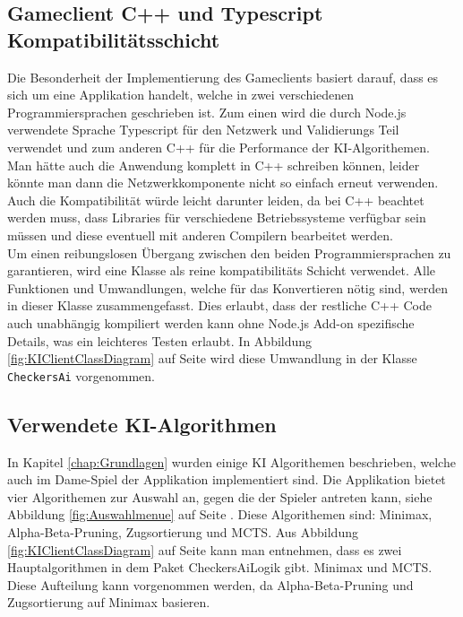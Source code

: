 \documentclass[12pt,a4paper,bibliography=totocnumbered,listof=totocnumbered]{article}
\begin{document}
\subsection{Gameclient C++ und Typescript Kompatibilitätsschicht}
Die Besonderheit der Implementierung des Gameclients basiert darauf, dass es sich um eine Applikation handelt, welche in zwei verschiedenen 
Programmiersprachen geschrieben ist. Zum einen wird die durch Node.js verwendete Sprache Typescript für den Netzwerk und Validierungs Teil 
verwendet und zum anderen C++ für die Performance der KI-Algorithemen. Man hätte auch die Anwendung komplett in C++ schreiben können, leider 
könnte man dann die Netzwerkkomponente nicht so einfach erneut verwenden. Auch die Kompatibilität würde leicht darunter leiden, da 
bei C++ beachtet werden muss, dass Libraries für verschiedene Betriebssysteme verfügbar sein müssen und diese eventuell mit anderen 
Compilern bearbeitet werden. 
\\
Um einen reibungslosen Übergang zwischen den beiden Programmiersprachen zu garantieren, wird eine Klasse als reine kompatibilitäts Schicht verwendet.
Alle Funktionen und Umwandlungen, welche für das Konvertieren nötig sind, werden in dieser Klasse zusammengefasst. Dies erlaubt, dass der restliche 
C++ Code auch unabhängig kompiliert werden kann ohne Node.js Add-on spezifische Details, was ein leichteres Testen erlaubt.
In Abbildung \ref{fig:KIClientClassDiagram} auf Seite \pageref{fig:KIClientClassDiagram} wird diese Umwandlung in der Klasse \texttt{CheckersAi} 
vorgenommen.

\subsection{Verwendete KI-Algorithmen}
\label{chap:KIAlgorithms}
In Kapitel \ref{chap:Grundlagen} wurden einige KI Algorithemen beschrieben, welche auch im Dame-Spiel der Applikation implementiert sind.
Die Applikation bietet vier Algorithemen zur Auswahl an, gegen die der Spieler antreten kann, siehe Abbildung \ref{fig:Auswahlmenue} auf Seite \pageref{fig:Auswahlmenue}. 
Diese Algorithemen sind: Minimax, Alpha-Beta-Pruning, Zugsortierung und MCTS.
Aus Abbildung \ref{fig:KIClientClassDiagram} auf Seite \pageref{fig:KIClientClassDiagram}
kann man entnehmen, dass es zwei Hauptalgorithmen in dem Paket CheckersAiLogik gibt. Minimax und MCTS. Diese Aufteilung kann vorgenommen werden,
da Alpha-Beta-Pruning und Zugsortierung auf Minimax basieren.
\end{document}
